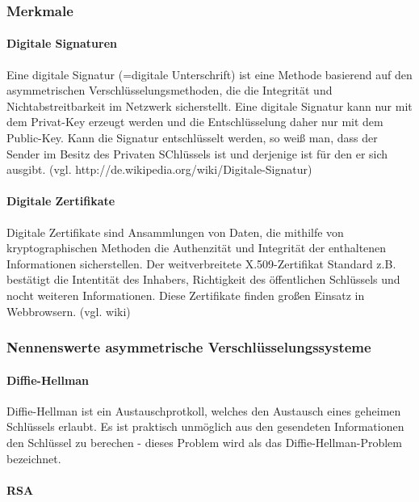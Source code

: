 \documentclass[11pt,a4paper]{report}
\begin{document}
\subsubsection{Merkmale}

\paragraph{Digitale Signaturen}

Eine digitale Signatur (=digitale Unterschrift) ist eine Methode basierend auf den asymmetrischen Verschlüsselungsmethoden, die die Integrität und Nichtabstreitbarkeit im Netzwerk sicherstellt. Eine digitale Signatur kann nur mit dem Privat-Key erzeugt werden und die Entschlüsselung daher nur mit dem Public-Key. Kann die Signatur entschlüsselt werden, so weiß man, dass der Sender im Besitz des Privaten SChlüssels ist und derjenige ist für den er sich ausgibt. (vgl. http://de.wikipedia.org/wiki/Digitale-Signatur)

\paragraph{Digitale Zertifikate}

Digitale Zertifikate sind Ansammlungen von Daten, die mithilfe von kryptographischen Methoden die Authenzität und Integrität der enthaltenen Informationen sicherstellen. Der weitverbreitete X.509-Zertifikat Standard z.B. bestätigt die Intentität des Inhabers, Richtigkeit des öffentlichen Schlüssels und nocht weiteren Informationen. Diese Zertifikate finden großen Einsatz in Webbrowsern. (vgl. wiki)

\subsubsection{Nennenswerte asymmetrische Verschlüsselungssysteme}

\paragraph{Diffie-Hellman}

Diffie-Hellman ist ein Austauschprotkoll, welches den Austausch eines geheimen Schlüssels erlaubt. Es ist praktisch unmöglich aus den gesendeten Informationen den Schlüssel zu berechen - dieses Problem wird als das Diffie-Hellman-Problem bezeichnet.

\paragraph{RSA}
\end{document}
